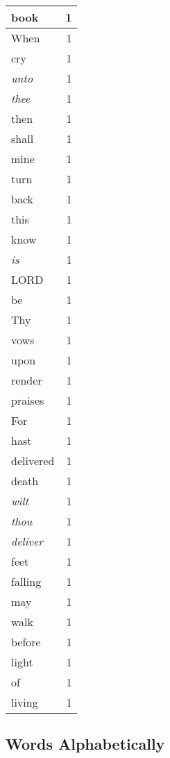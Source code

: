 \begin{center}
\begin{longtable}{l|r}
book & 1 \\ \hline
When & 1 \\ \hline
cry & 1 \\ \hline
\emph{unto} & 1 \\ \hline
\emph{thee} & 1 \\ \hline
then & 1 \\ \hline
shall & 1 \\ \hline
mine & 1 \\ \hline
turn & 1 \\ \hline
back & 1 \\ \hline
this & 1 \\ \hline
know & 1 \\ \hline
\emph{is} & 1 \\ \hline
LORD & 1 \\ \hline
be & 1 \\ \hline
Thy & 1 \\ \hline
vows & 1 \\ \hline
upon & 1 \\ \hline
render & 1 \\ \hline
praises & 1 \\ \hline
For & 1 \\ \hline
hast & 1 \\ \hline
delivered & 1 \\ \hline
death & 1 \\ \hline
\emph{wilt} & 1 \\ \hline
\emph{thou} & 1 \\ \hline
\emph{deliver} & 1 \\ \hline
feet & 1 \\ \hline
falling & 1 \\ \hline
may & 1 \\ \hline
walk & 1 \\ \hline
before & 1 \\ \hline
light & 1 \\ \hline
of & 1 \\ \hline
living & 1 \\ \hline
\end{longtable}
\end{center}



\normalsize



\subsection{Words Alphabetically}

